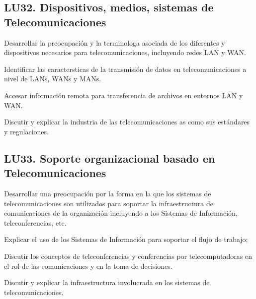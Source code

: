 \subsection{LU32. Dispositivos, medios, sistemas de Telecomunicaciones}\label{sec:LU32}
\begin{LearningUnit}
\begin{LUGoal}
\item Desarrollar la preocupación y la terminolog­a asociada de los diferentes y dispositivos necesarios para telecomunicaciones, incluyendo redes LAN y WAN.
\end{LUGoal}

\begin{LUObjective}
\item Identificar las caracter­sticas de la transmisión de datos en telecomunicaciones a nivel de LANs, WANs y MANs.
\item Accesar información remota para transferencia de archivos en entornos LAN y WAN.
\item Discutir y explicar la industria de las telecomunicaciones as­ como sus estándares y regulaciones.
\end{LUObjective}
\end{LearningUnit}

\subsection{LU33. Soporte organizacional basado en Telecomunicaciones}\label{sec:LU33}
\begin{LearningUnit}
\begin{LUGoal}
\item Desarrollar una preocupación por la forma en la que los sistemas de telecomunicaciones son utilizados para soportar la infraestructura de comunicaciones de la organización incluyendo a los Sistemas de Información, teleconferencias, etc.
\end{LUGoal}

\begin{LUObjective}
\item Explicar el uso de los Sistemas de Información para soportar el flujo de trabajo;
\item Discutir los conceptos de teleconferencias y conferencias por telecomputadoras en el rol de las comunicaciones y en la toma de decisiones.
\item Discutir y explicar la infraestructura involucrada en los sistemas de telecomunicaciones.
\end{LUObjective}
\end{LearningUnit}


